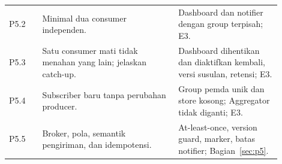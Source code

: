 \begin{longtable}{P{0.11\linewidth}P{0.45\linewidth}P{0.34\linewidth}}
P5.2 & Minimal dua consumer independen. & Dashboard dan notifier dengan group terpisah; E3.\\
P5.3 & Satu consumer mati tidak menahan yang lain; jelaskan catch-up. & Dashboard dihentikan dan diaktifkan kembali, versi susulan, retensi; E3.\\
P5.4 & Subscriber baru tanpa perubahan producer. & Group pemda unik dan store kosong; Aggregator tidak diganti; E3.\\
P5.5 & Broker, pola, semantik pengiriman, dan idempotensi. & At-least-once, version guard, marker, batas notifier; Bagian~\ref{sec:p5}.\\
\bottomrule
\end{longtable}
\normalsize

